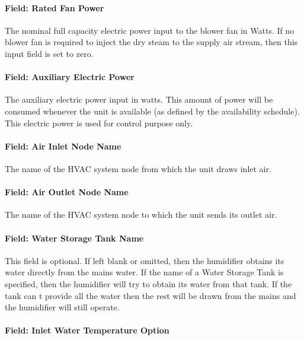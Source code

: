\paragraph{Field: Rated Fan Power}\label{field-rated-fan-power-1}

The nominal full capacity electric power input to the blower fan in Watts. If no blower fan is required to inject the dry steam to the supply air stream, then this input field is set to zero.

\paragraph{Field: Auxiliary Electric Power}\label{field-auxiliary-electric-power}

The auxiliary electric power input in watts. This amount of power will be consumed whenever the unit is available (as defined by the availability schedule). This electric power is used for control purpose only.

\paragraph{Field: Air Inlet Node Name}\label{field-air-inlet-node-name-1-004}

The name of the HVAC system node from which the unit draws inlet air.

\paragraph{Field: Air Outlet Node Name}\label{field-air-outlet-node-name-1-003}

The name of the HVAC system node to which the unit sends its outlet air.

\paragraph{Field: Water Storage Tank Name}\label{field-water-storage-tank-name-1}

This field is optional. If left blank or omitted, then the humidifier obtains its water directly from the mains water. If the name of a Water Storage Tank is specified, then the humidifier will try to obtain its water from that tank. If the tank can t provide all the water then the rest will be drawn from the mains and the humidifier will still operate.

\paragraph{Field: Inlet Water Temperature Option}\label{field-inlet-water-temperature-option}

